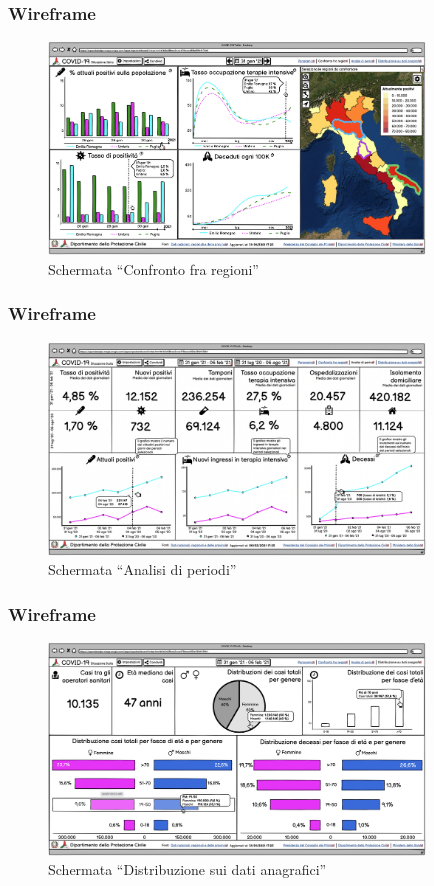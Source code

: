 \documentclass[handout]{beamer}
\begin{document}
		\begin{frame}
			\frametitle{Wireframe}
			\begin{figure}
				\includegraphics[width=10cm]{img/confronto-regioni}
				\caption{Schermata ``Confronto fra regioni''}
			\end{figure}
		\end{frame}

		\begin{frame}
			\frametitle{Wireframe}
			\begin{figure}
				\includegraphics[width=10cm]{img/new-analisi-periodi}
				\caption{Schermata ``Analisi di periodi''}
			\end{figure}
		\end{frame}

		\begin{frame}
			\frametitle{Wireframe}
			\begin{figure}
				\includegraphics[width=10cm]{img/distribuzione-dati-anagrafici}
				\caption{Schermata ``Distribuzione sui dati anagrafici''}
			\end{figure}
		\end{frame}
\end{document}
